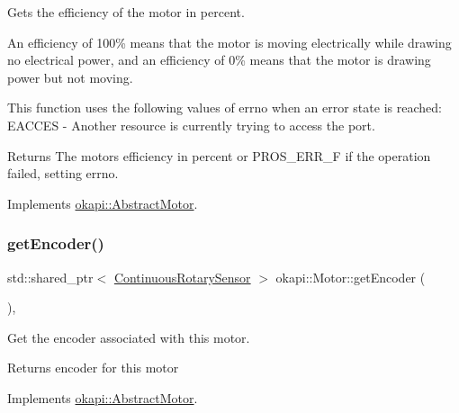 Gets the efficiency of the motor in percent.

An efficiency of 100\% means that the motor is moving electrically while drawing no electrical power, and an efficiency of 0\% means that the motor is drawing power but not moving.

This function uses the following values of errno when an error state is reached\+: E\+A\+C\+C\+ES -\/ Another resource is currently trying to access the port.

\begin{DoxyReturn}{Returns}
The motor\textquotesingle{}s efficiency in percent or P\+R\+O\+S\+\_\+\+E\+R\+R\+\_\+F if the operation failed, setting errno. 
\end{DoxyReturn}


Implements \mbox{\hyperlink{classokapi_1_1AbstractMotor_a27a6e3ec007619a9b91f9d6ebc61e613}{okapi\+::\+Abstract\+Motor}}.

\mbox{\label{classokapi_1_1Motor_a57d8ddb900475fcfba56413e61e6e252}} 
\subsubsection{\texorpdfstring{getEncoder()}{getEncoder()}}
{\footnotesize\ttfamily std\+::shared\+\_\+ptr$<$ \mbox{\hyperlink{classokapi_1_1ContinuousRotarySensor}{Continuous\+Rotary\+Sensor}} $>$ okapi\+::\+Motor\+::get\+Encoder (\begin{DoxyParamCaption}{ }\end{DoxyParamCaption})\hspace{0.3cm}{\ttfamily [override]}, {\ttfamily [virtual]}}

Get the encoder associated with this motor.

\begin{DoxyReturn}{Returns}
encoder for this motor 
\end{DoxyReturn}


Implements \mbox{\hyperlink{classokapi_1_1AbstractMotor_a87177280c20a855a74354dd8ba6e1d6a}{okapi\+::\+Abstract\+Motor}}.

\mbox{\label{classokapi_1_1Motor_afcc6183588ce056927878dfc479e6fee}} 
